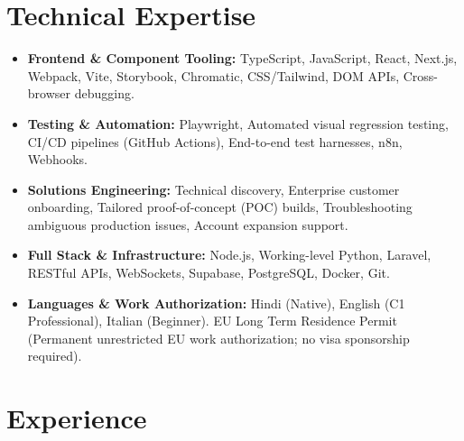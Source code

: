 \documentclass[10pt,a4paper]{article}
\begin{document}
\section{Technical Expertise}
\begin{itemize}
  \item \textbf{Frontend \& Component Tooling:} TypeScript, JavaScript, React, Next.js, Webpack, Vite, Storybook, Chromatic, CSS/Tailwind, DOM APIs, Cross-browser debugging.
  \item \textbf{Testing \& Automation:} Playwright, Automated visual regression testing, CI/CD pipelines (GitHub Actions), End-to-end test harnesses, n8n, Webhooks.
  \item \textbf{Solutions Engineering:} Technical discovery, Enterprise customer onboarding, Tailored proof-of-concept (POC) builds, Troubleshooting ambiguous production issues, Account expansion support.
  \item \textbf{Full Stack \& Infrastructure:} Node.js, Working-level Python, Laravel, RESTful APIs, WebSockets, Supabase, PostgreSQL, Docker, Git.
  \item \textbf{Languages \& Work Authorization:} Hindi (Native), English (C1 Professional), Italian (Beginner). EU Long Term Residence Permit (Permanent unrestricted EU work authorization; no visa sponsorship required).
\end{itemize}

\section{Experience}
\end{document}
